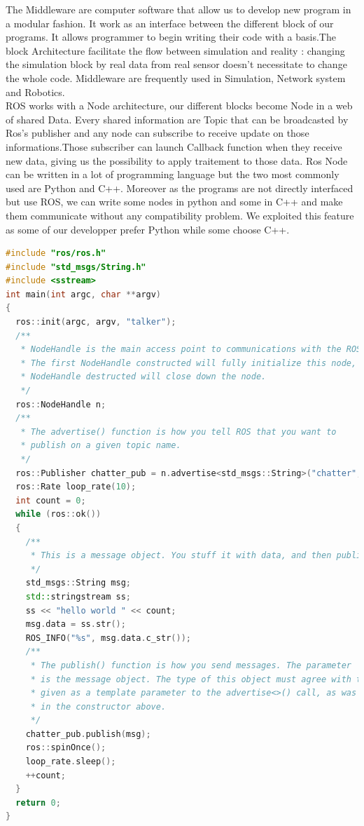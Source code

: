 \documentclass[a4paper]{report}
\begin{document}
The Middleware are computer software that allow us to develop new program in a modular fashion. It work as an interface between the different block of our programs. It allows programmer to begin writing their code with a basis.The block Architecture facilitate the flow between simulation and reality : changing the simulation block by real data from real sensor doesn't necessitate to change the whole code. Middleware are frequently used in Simulation, Network system and Robotics.\\

ROS works with a Node architecture, our different blocks become Node in a web of shared Data. Every shared information are Topic that can be broadcasted by Ros's publisher and any node can subscribe to receive update on those informations.Those subscriber can launch Callback function when they receive new data, giving us the possibility to apply traitement to those data. Ros Node can be written in a lot of programming language but the two most commonly used are Python and C++. Moreover as the programs are not directly interfaced but use ROS, we can write some nodes in python and some in C++ and make them communicate without any compatibility problem. We exploited this feature as some of our developper prefer Python while some choose C++.\\

\renewcommand{\lstlistingname}{Code}
\begin{lstlisting}[language=C++, caption={Simple Publisher}, frame=single]
#include "ros/ros.h"
#include "std_msgs/String.h"
#include <sstream>
int main(int argc, char **argv)
{
  ros::init(argc, argv, "talker");
  /**
   * NodeHandle is the main access point to communications with the ROS system.
   * The first NodeHandle constructed will fully initialize this node, and the last
   * NodeHandle destructed will close down the node.
   */
  ros::NodeHandle n;
  /**
   * The advertise() function is how you tell ROS that you want to
   * publish on a given topic name.
   */
  ros::Publisher chatter_pub = n.advertise<std_msgs::String>("chatter", 1000);
  ros::Rate loop_rate(10);
  int count = 0;
  while (ros::ok())
  {
    /**
     * This is a message object. You stuff it with data, and then publish it.
     */
    std_msgs::String msg;
    std::stringstream ss;
    ss << "hello world " << count;
    msg.data = ss.str();
    ROS_INFO("%s", msg.data.c_str());
    /**
     * The publish() function is how you send messages. The parameter
     * is the message object. The type of this object must agree with the type
     * given as a template parameter to the advertise<>() call, as was done
     * in the constructor above.
     */
    chatter_pub.publish(msg);
    ros::spinOnce();
    loop_rate.sleep();
    ++count;
  }
  return 0;
}
\end{lstlisting}
\end{document}
